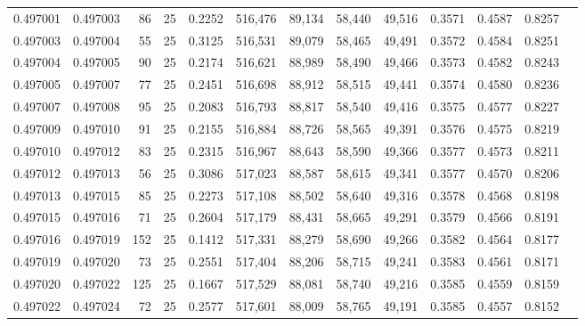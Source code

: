 \begin{tabular}{rrrrrrrrrrrrr}
0.497001 & 0.497003 &    86 &  25 &                                     0.2252 & 516,476 &  89,134 &  58,440 &  49,516 & 0.3571 & 0.4587 & 0.8257 \\
0.497003 & 0.497004 &    55 &  25 &                                     0.3125 & 516,531 &  89,079 &  58,465 &  49,491 & 0.3572 & 0.4584 & 0.8251 \\
0.497004 & 0.497005 &    90 &  25 &                                     0.2174 & 516,621 &  88,989 &  58,490 &  49,466 & 0.3573 & 0.4582 & 0.8243 \\
0.497005 & 0.497007 &    77 &  25 &                                     0.2451 & 516,698 &  88,912 &  58,515 &  49,441 & 0.3574 & 0.4580 & 0.8236 \\
0.497007 & 0.497008 &    95 &  25 &                                     0.2083 & 516,793 &  88,817 &  58,540 &  49,416 & 0.3575 & 0.4577 & 0.8227 \\
0.497009 & 0.497010 &    91 &  25 &                                     0.2155 & 516,884 &  88,726 &  58,565 &  49,391 & 0.3576 & 0.4575 & 0.8219 \\
0.497010 & 0.497012 &    83 &  25 &                                     0.2315 & 516,967 &  88,643 &  58,590 &  49,366 & 0.3577 & 0.4573 & 0.8211 \\
0.497012 & 0.497013 &    56 &  25 &                                     0.3086 & 517,023 &  88,587 &  58,615 &  49,341 & 0.3577 & 0.4570 & 0.8206 \\
0.497013 & 0.497015 &    85 &  25 &                                     0.2273 & 517,108 &  88,502 &  58,640 &  49,316 & 0.3578 & 0.4568 & 0.8198 \\
0.497015 & 0.497016 &    71 &  25 &                                     0.2604 & 517,179 &  88,431 &  58,665 &  49,291 & 0.3579 & 0.4566 & 0.8191 \\
0.497016 & 0.497019 &   152 &  25 &                                     0.1412 & 517,331 &  88,279 &  58,690 &  49,266 & 0.3582 & 0.4564 & 0.8177 \\
0.497019 & 0.497020 &    73 &  25 &                                     0.2551 & 517,404 &  88,206 &  58,715 &  49,241 & 0.3583 & 0.4561 & 0.8171 \\
0.497020 & 0.497022 &   125 &  25 &                                     0.1667 & 517,529 &  88,081 &  58,740 &  49,216 & 0.3585 & 0.4559 & 0.8159 \\
0.497022 & 0.497024 &    72 &  25 &                                     0.2577 & 517,601 &  88,009 &  58,765 &  49,191 & 0.3585 & 0.4557 & 0.8152 \\

\end{tabular}
